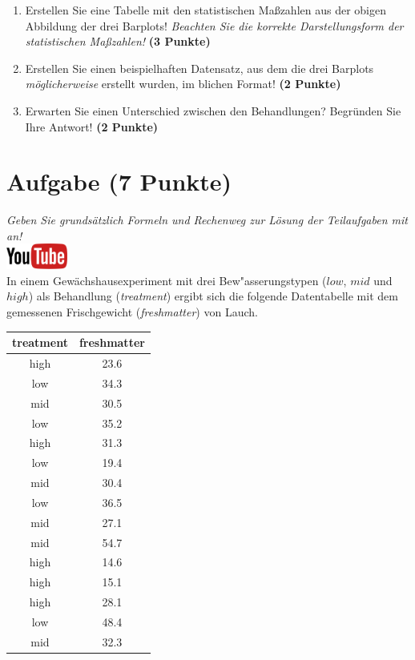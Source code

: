 \documentclass[a4paper, 9pt]{scrartcl}\usepackage[]{graphicx}\usepackage[]{xcolor}
\begin{document}
\begin{enumerate}
\item Erstellen Sie eine Tabelle mit den statistischen Ma{\ss}zahlen aus der
  obigen Abbildung der drei Barplots! \textit{Beachten Sie die korrekte
    Darstellungsform der statistischen Ma{\ss}zahlen!} \textbf{(3 Punkte)}
\item Erstellen Sie einen beispielhaften Datensatz, aus dem die drei
  Barplots \textit{m{\"o}glicherweise} erstellt wurden, im blichen Format! \textbf{(2 Punkte)}
\item Erwarten Sie einen Unterschied zwischen den Behandlungen? Begr{\"u}nden
  Sie Ihre Antwort! \textbf{(2 Punkte)}
\end{enumerate} 
\clearpage

\section{Aufgabe \hfill (7 Punkte)}

\textit{Geben Sie grunds{\"a}tzlich Formeln und Rechenweg zur L{\"o}sung der
  Teilaufgaben mit an!} \\[1Ex]

\hfill\href{https://youtu.be/vXnLttRL_VI}{\includegraphics[width =
  2cm]{img/youtube}}\\[1Ex]



In einem Gew{\"a}chshausexperiment mit drei Bew{"a}sserungstypen ($low$, $mid$ und $high$) als Behandlung
(\textit{treatment}) ergibt sich die folgende Datentabelle mit dem
gemessenen Frischgewicht (\textit{freshmatter}) von Lauch.

\begin{table}[!h]
\centering
\begin{tabular}{cc}
\toprule
treatment & freshmatter\\
\midrule
high & 23.6\\
low & 34.3\\
mid & 30.5\\
low & 35.2\\
high & 31.3\\
\addlinespace
low & 19.4\\
mid & 30.4\\
low & 36.5\\
mid & 27.1\\
mid & 54.7\\
\addlinespace
high & 14.6\\
high & 15.1\\
high & 28.1\\
low & 48.4\\
mid & 32.3\\
\bottomrule
\end{tabular}
\end{table}
\end{document}
